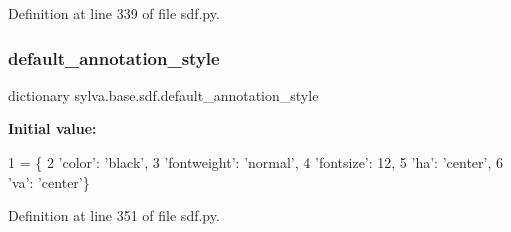 Definition at line 339 of file sdf.\+py.

\mbox{\label{namespacesylva_1_1base_1_1sdf_a2fc7e4f9875075ae2cc4d82650265733}} 
\subsubsection{\texorpdfstring{default\+\_\+annotation\+\_\+style}{default\_annotation\_style}}
{\footnotesize\ttfamily dictionary sylva.\+base.\+sdf.\+default\+\_\+annotation\+\_\+style}

{\bfseries Initial value\+:}
\begin{DoxyCode}
1 =  \{
2         \textcolor{stringliteral}{'color'}: \textcolor{stringliteral}{'black'},
3         \textcolor{stringliteral}{'fontweight'}: \textcolor{stringliteral}{'normal'},
4         \textcolor{stringliteral}{'fontsize'}: 12,
5         \textcolor{stringliteral}{'ha'}: \textcolor{stringliteral}{'center'},
6         \textcolor{stringliteral}{'va'}: \textcolor{stringliteral}{'center'}\}
\end{DoxyCode}


Definition at line 351 of file sdf.\+py.

